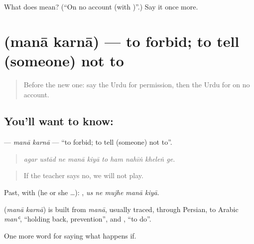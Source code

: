 \begin{tcolorbox}[breakable,colback=teal!4,colframe=teal!35!black,title={Before you move on}]
What does  mean? (\textquotedblleft{}On no account (with )\textquotedblright{}.) Say it once more.
\end{tcolorbox}
\section[\texorpdfstring{\ur{منع} \ur{کرنا} (manā karnā)}{منع کرنا (manā karnā)}]{  (manā karnā) — to forbid; to tell (someone) not to}

\label{lesson:UR-C366-mana-karna}



\begin{quote}
Before the new one: say the Urdu for permission, then the Urdu for on no account.
\end{quote}

\subsection*{You'll want to know:  }
\textbf{ } — \emph{manā karnā} — \textquotedblleft{}to forbid; to tell (someone) not to\textquotedblright{}.

\begin{quote}
         
\end{quote}

\begin{quote}
\emph{agar ustād ne manā kiyā to ham nahīṅ kheleṅ ge.}
\end{quote}

\begin{quote}
If the teacher says no, we will not play.
\end{quote}

Past, with  (he or she …):     , \emph{us ne mujhe manā kiyā}.

\begin{cousinweb}
\textbf{ } (\emph{manā karnā}) is built from \emph{manā}, usually traced, through Persian, to Arabic \emph{manʿ}, \textquotedblleft{}holding back, prevention\textquotedblright{}, and \textbf{}, \textquotedblleft{}to do\textquotedblright{}.
\end{cousinweb}

\begin{grammarlens}[title={What you've built}]
One more word for saying what happens if.
\end{grammarlens}


